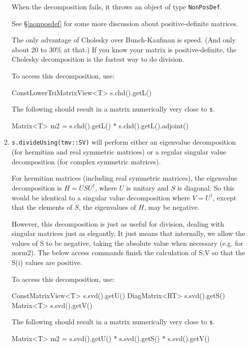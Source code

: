\documentclass[twoside,letterpaper,11pt]{article}
\renewcommand{\tt}[1]{{\lstinline {#1}}}
\begin{document}
\begin{enumerate}
When the decomposition fails, it throws an object of type
\tt{NonPosDef}.

See \S\ref{nonposdef} for some more discussion about positive-definite
matrices.

The only advantage of Cholesky over Bunch-Kaufman is speed.  (And only about
20 to 30\% at that.)  If you know your 
matrix is positive-definite, the Cholesky decomposition is the fastest way to 
do division.

To access this decomposition, use:
\begin{tmvcode}
ConstLowerTriMatrixView<T> s.chd().getL()
\end{tmvcode}
The following should result in a matrix numerically very close to \tt{s}.
\begin{tmvcode}
Matrix<T> m2 = s.chd().getL() * s.chd().getL().adjoint()
\end{tmvcode}

\item
\tt{s.divideUsing(tmv::SV)} will perform either an eigenvalue decomposition
(for hermitian and real symmetric matrices) or a regular singular value
decomposition (for complex symmetric matrices).

For hermitian matrices (including real symmetric matrices), 
the eigenvalue decomposition is $H = U S U^\dagger$, where $U$ is
unitary and $S$ is diagonal.  So this would be identical to a singular
value decomposition where $V = U^\dagger$, 
except that the elements of $S$, the eigenvalues of $H$, may be negative.

However, this decomposition is just as useful for division, dealing with singular
matrices just as elegantly.  It just means that internally, we allow the values
of S to be negative, taking the absolute value when necessary (e.g. for norm2).
The below access commands finish the calculation of S,V so that the S(i)
values are positive. 

To access this decomposition, use:
\begin{tmvcode}
ConstMatrixView<T> s.svd().getU()
DiagMatrix<RT> s.svd().getS()
Matrix<T> s.svd().getV()
\end{tmvcode}
The following should result in a matrix numerically very close to \tt{s}.
\begin{tmvcode}
Matrix<T> m2 = s.svd().getU() * s.svd().getS() * s.svd().getV()
\end{tmvcode}


\end{enumerate}
\end{document}

